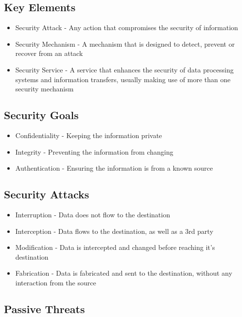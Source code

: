 
\subsection*{Key Elements}

\begin{itemize}
  \item Security Attack - Any action that compromises the security of information
  \item Security Mechanism - A mechanism that is designed to detect, prevent or recover from an attack
  \item Security Service - A service that enhances the security of data processing systems and information transfers, usually making use of more than one security mechanism
\end{itemize}

\subsection*{Security Goals}

\begin{itemize}
  \item Confidentiality - Keeping the information private
  \item Integrity - Preventing the information from changing
  \item Authentication - Ensuring the information is from a known source
\end{itemize}

\subsection*{Security Attacks}

\begin{itemize}
  \item Interruption - Data does not flow to the destination
  \item Interception - Data flows to the destination, as well as a 3rd party
  \item Modification - Data is intercepted and changed before reaching it's destination
  \item Fabrication - Data is fabricated and sent to the destination, without any interaction from the source
\end{itemize}

\subsection*{Passive Threats}

